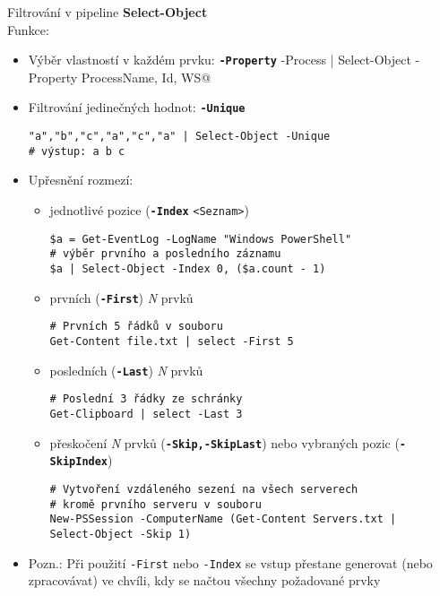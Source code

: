 \documentclass[main.tex]{subfiles}
\begin{document}
\begin{frame}{Filtrování v pipeline}
\framebreak
  \textbf{Select-Object}\\[2mm]
  Funkce:
    \begin{itemize}
       \setlength\itemsep{1em}
       \item Výběr vlastností v každém prvku: \textbf{\texttt{-Property}}
         {\small
        \texttt@Get-Process | Select-Object -Property ProcessName, Id, WS@
        }
      \item Filtrování jedinečných hodnot: \textbf{\texttt{-Unique}}
        \begin{verbatim}
"a","b","c","a","c","a" | Select-Object -Unique
# výstup: a b c
        \end{verbatim}
      \item Upřesnění rozmezí:
        \begin{itemize}
          \item jednotlivé pozice (\textbf{\texttt{-Index}} \texttt{<Seznam>})
        \begin{verbatim}
$a = Get-EventLog -LogName "Windows PowerShell"
# výběr prvního a posledního záznamu
$a | Select-Object -Index 0, ($a.count - 1)
        \end{verbatim}
        \framebreak
          \item prvních (\textbf{\texttt{-First}}) \textit{N} prvků
            \begin{verbatim}
# Prvních 5 řádků v souboru
Get-Content file.txt | select -First 5
            \end{verbatim}
          \item posledních (\textbf{\texttt{-Last}}) \textit{N} prvků
            \begin{verbatim}
# Poslední 3 řádky ze schránky
Get-Clipboard | select -Last 3
            \end{verbatim}
          \item přeskočení \textit{N} prvků (\textbf{\texttt{-Skip,-SkipLast}}) nebo vybraných pozic (\textbf{\texttt{-SkipIndex}})
\begin{verbatim}
# Vytvoření vzdáleného sezení na všech serverech
# kromě prvního serveru v souboru
New-PSSession -ComputerName (Get-Content Servers.txt |
Select-Object -Skip 1)
\end{verbatim}
        \end{itemize}
      \item Pozn.: Při použití \texttt{-First} nebo \texttt{-Index} se vstup přestane generovat (nebo zpracovávat) ve chvíli, kdy se načtou všechny požadované prvky

\end{itemize}
\end{frame}
\end{document}
